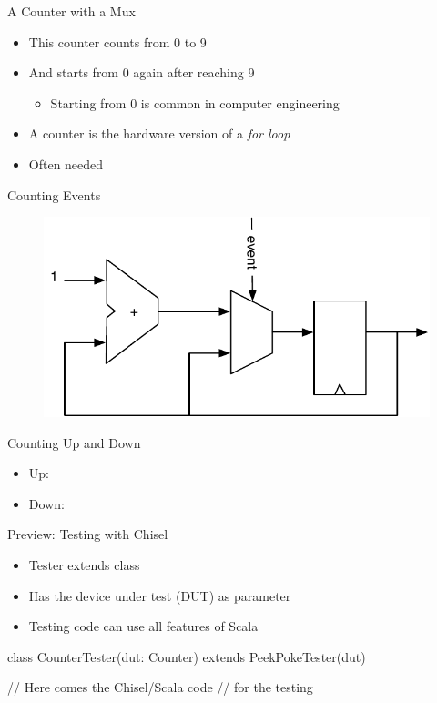 \begin{frame}[fragile]{A Counter with a Mux}
\begin{itemize}
\item This counter counts from 0 to 9
\item And starts from 0 again after reaching 9
\begin{itemize}
\item Starting from 0 is common in computer engineering
\end{itemize}
\item A counter is the hardware version of a \emph{for loop}
\item Often needed
\end{itemize}
\end{frame}

\begin{frame}[fragile]{Counting Events}
\begin{figure}
  \includegraphics[scale=\scale]{../figures/event-counter}
\end{figure}
\end{frame}


\begin{frame}[fragile]{Counting Up and Down}
\begin{itemize}
\item Up:
\item Down:
\end{itemize}
\end{frame}


\begin{frame}[fragile]{Preview: Testing with Chisel}
\begin{itemize}
\item Tester extends class 
\item Has the device under test (DUT) as parameter
\item Testing code can use all features of Scala
\end{itemize}
\begin{chisel}
class CounterTester(dut: Counter) extends PeekPokeTester(dut) {

  // Here comes the Chisel/Scala code
  // for the testing
}
\end{chisel}
\end{frame}


